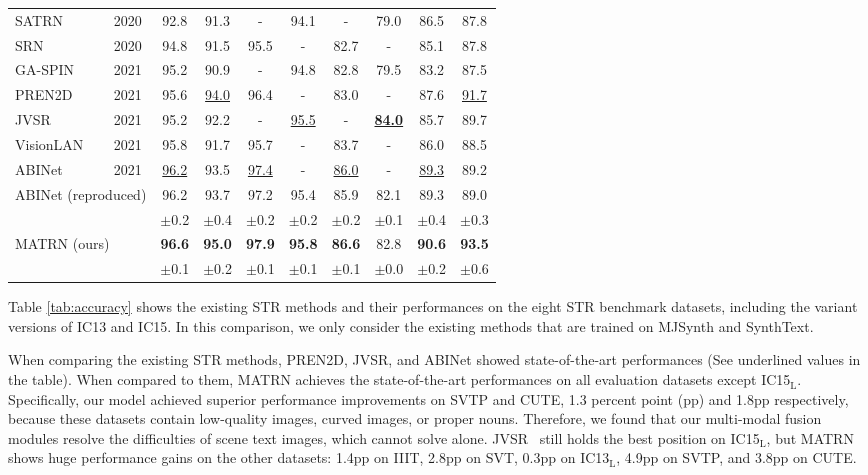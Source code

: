 \documentclass[runningheads]{llncs}
\begin{document}
\begin{table}[t]
\begin{centering}
\begin{tabular}{ll|cccc|cccc}
 SATRN~\cite{SATRN} & 2020 & 92.8 & 91.3 & - & 94.1 & - & 79.0 & 86.5 & 87.8 \\
 SRN~\cite{Yu_2020_CVPR_SRN} & 2020 & 94.8 & 91.5 & 95.5 & - & 82.7 & - & 85.1 & 87.8 \\
 GA-SPIN~\cite{zhang2020spin} & 2021 & 95.2 & 90.9 & - & 94.8 & 82.8 & 79.5 & 83.2 & 87.5 \\
 PREN2D~\cite{PREN} & 2021 & 95.6 & \underline{94.0} & 96.4 & - & 83.0 & - & 87.6 & \underline{91.7} \\
 JVSR~\cite{JVSR} & 2021 & 95.2 & 92.2 & - & \underline{95.5} & - & \underline{\textbf{84.0}} & 85.7 & 89.7 \\
 VisionLAN~\cite{VisionLAN} & 2021 & 95.8 & 91.7 & 95.7 & - & 83.7 & - & 86.0 & 88.5 \\
 ABINet~\cite{ABINet} & 2021 & \underline{96.2} & 93.5 & \underline{97.4} & - & \underline{86.0} & - & \underline{89.3} & 89.2 \\ \midrule
 \multicolumn{2}{l|}{ABINet (reproduced)} & 96.2 & 93.7 & 97.2 & 95.4 & 85.9 & 82.1 & 89.3 & 89.0 \\
 [-0.3em] & & \scriptsize $\pm$0.2 & \scriptsize $\pm$0.4 & \scriptsize $\pm$0.2 & \scriptsize $\pm$0.2 & \scriptsize $\pm$0.2 & \scriptsize $\pm$0.1 &\scriptsize $\pm$0.4 & \scriptsize $\pm$0.3 \\
 \multicolumn{2}{l|}{MATRN (ours)} & \textbf{96.6} & \textbf{95.0} & \textbf{97.9} & \textbf{95.8} & \textbf{86.6} & 82.8 & \textbf{90.6} & \textbf{93.5} \\ [-0.3em]
 & & \scriptsize $\pm$0.1 & \scriptsize $\pm$0.2 & \scriptsize $\pm$0.1 & \scriptsize $\pm$0.1 & \scriptsize $\pm$0.1 & \scriptsize $\pm$0.0 & \scriptsize $\pm$0.2 & \scriptsize $\pm$0.6 \\
 
\bottomrule
\end{tabular}
\end{centering}
\end{table}


Table \ref{tab:accuracy} shows the existing STR methods and their performances on the eight STR benchmark datasets, including the variant versions of IC13 and IC15. 
In this comparison, we only consider the existing methods that are trained on MJSynth and SynthText.

When comparing the existing STR methods, PREN2D, JVSR, and ABINet showed state-of-the-art performances (See underlined values in the table). When compared to them, MATRN achieves the state-of-the-art performances on all evaluation datasets except IC15$_\text{L}$. Specifically, our model achieved superior performance improvements on SVTP and CUTE, 1.3 percent point (pp) and 1.8pp respectively, because these datasets contain low-quality images, curved images, or proper nouns. Therefore, we found that our multi-modal fusion modules resolve the difficulties of scene text images, which cannot solve alone. JVSR~\cite{JVSR} still holds the best position on IC15$_\text{L}$, but MATRN shows huge performance gains on the other datasets: 1.4pp on IIIT, 2.8pp on SVT, 0.3pp on IC13$_\text{L}$, 4.9pp on SVTP, and 3.8pp on CUTE.
\end{document}
